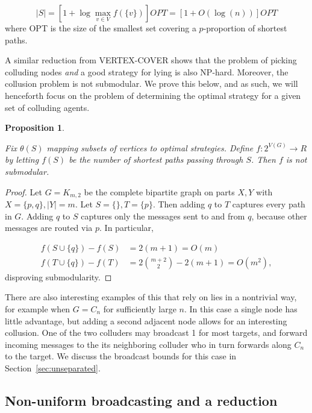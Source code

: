 \documentclass[reprint]{revtex4-1}
\newtheorem{proposition}{Proposition}[section]
\begin{document}
$$ |S| = \left [ 1 + \log \max_{v \in V} f(\{ v \}) \right ] OPT
       = \left [ 1 + O(\log(n)) \right ] OPT$$
where OPT is the size of the smallest set covering a $p$-proportion of shortest
paths. 

A similar reduction from VERTEX-COVER shows that the problem of picking
colluding nodes \emph{and} a good strategy for lying is also NP-hard. Moreover,
the collusion problem is not submodular. We prove this below, and as such, we
will henceforth focus on the problem of determining the optimal strategy for a
given set of colluding agents.

\begin{proposition} \label{prop:not-submodular}

Fix $\theta(S)$ mapping subsets of vertices to optimal strategies. Define $f:
2^{V(G)} \to R$ by letting $f(S)$ be the number of shortest paths passing through $S$. Then $f$ is not submodular.
\end{proposition}

\begin{proof}

Let $G = K_{m,2}$ be the complete bipartite graph on parts $X,Y$ with $X = \{
p,q \}, |Y|=m$. Let $S = \{ \}, T = \{ p \}$. Then adding $q$ to $T$ captures
every path in $G$. Adding $q$ to $S$ captures only the messages sent to and
from $q$, because other messages are routed via $p$. In particular,

\begin{align*}
   f(S \cup \{ q \}) - f(S) &= 2(m+1) = O(m) \\ 
   f(T \cup \{ q \}) - f(T) &= 2 \binom{m+2}{2} - 2(m+1) = O(m^2),
\end{align*}
disproving submodularity. 
\end{proof}

There are also interesting examples of this that rely on lies in a nontrivial
way, for example when $G = C_n$ for sufficiently large $n$. In this case a
single node has little advantage, but adding a second adjacent node allows for
an interesting collusion. One of the two colluders may broadcast 1 for most
targets, and forward incoming messages to the its neighboring colluder who in
turn forwards along $C_n$ to the target. We discuss the broadcast bounds for
this case in Section~\ref{sec:unseparated}.

\subsection{Non-uniform broadcasting and a reduction} \label{sec:reduction}
\end{document}
